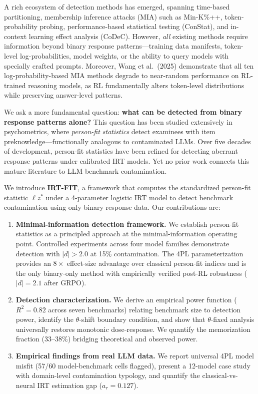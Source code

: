 \documentclass[11pt,a4paper]{article}
\begin{document}
A rich ecosystem of detection methods has emerged, spanning time-based partitioning, membership inference attacks (MIA) such as Min-K\%++, token-probability probing, performance-based statistical testing (ConStat), and in-context learning effect analysis (CoDeC).
However, \emph{all} existing methods require information beyond binary response patterns---training data manifests, token-level log-probabilities, model weights, or the ability to query models with specially crafted prompts.
Moreover, Wang et al.\ (2025) demonstrate that all ten log-probability-based MIA methods degrade to near-random performance on RL-trained reasoning models, as RL fundamentally alters token-level distributions while preserving answer-level patterns.

We ask a more fundamental question: \textbf{what can be detected from binary response patterns alone?}
This question has been studied extensively in psychometrics, where \emph{person-fit statistics} detect examinees with item preknowledge---functionally analogous to contaminated LLMs.
Over five decades of development, person-fit statistics have been refined for detecting aberrant response patterns under calibrated IRT models.
Yet no prior work connects this mature literature to LLM benchmark contamination.

We introduce \textbf{IRT-FIT}, a framework that computes the standardized person-fit statistic $\ell z^*$ under a 4-parameter logistic IRT model to detect benchmark contamination using only binary response data.
Our contributions are:

\begin{enumerate}[leftmargin=*,itemsep=2pt]
\item \textbf{Minimal-information detection framework.} We establish person-fit statistics as a principled approach at the minimal-information operating point. Controlled experiments across four model families demonstrate detection with $|d|>2.0$ at 15\% contamination. The 4PL parameterization provides an $8\times$ effect-size advantage over classical person-fit indices and is the only binary-only method with empirically verified post-RL robustness ($|d|{=}2.1$ after GRPO).

\item \textbf{Detection characterization.} We derive an empirical power function ($R^2{=}0.82$ across seven benchmarks) relating benchmark size to detection power, identify the $\theta$-shift boundary condition, and show that $\theta$-fixed analysis universally restores monotonic dose-response. We quantify the memorization fraction (33--38\%) bridging theoretical and observed power.

\item \textbf{Empirical findings from real LLM data.} We report universal 4PL model misfit (57/60 model-benchmark cells flagged), present a 12-model case study with domain-level contamination typology, and quantify the classical-vs-neural IRT estimation gap ($a_r{=}0.127$).
\end{enumerate}
\end{document}
